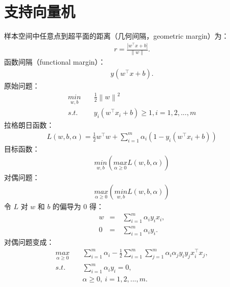 \documentclass[letterpaper,10pt,english]{sphinxmanual}
\begin{document}
\section{支持向量机}
\label{\detokenize{machineLearning/02_svm::doc}}\label{\detokenize{machineLearning/02_svm:id1}}
样本空间中任意点到超平面的距离（几何间隔，geometric margin）为：
\begin{equation*}
\begin{split}r = \frac{|w^{\top} x + b|}{\| w \|}.\end{split}
\end{equation*}
函数间隔（functional margin）：
\begin{equation*}
\begin{split}y(w^{\top} x + b).\end{split}
\end{equation*}
原始问题：
\begin{equation*}
\begin{split}\underset{w,b}{min} & &\  \frac{1}{2} \left \| w \right \|^2 \\
s.t. & &\  y_i(w^{\top} x_i + b) \geqslant 1, i=1,2,...,m\end{split}
\end{equation*}
拉格朗日函数：
\begin{equation*}
\begin{split}L(w,b,\alpha) = \frac{1}{2}w^{\top}w + \sum_{i=1}^m \alpha_i(1 - y_i(w^{\top} x_i + b))\end{split}
\end{equation*}
目标函数：
\begin{equation*}
\begin{split}\underset{w,b}{min}(\underset{\alpha \geqslant 0}{max}L(w,b,\alpha))\end{split}
\end{equation*}
对偶问题：
\begin{equation*}
\begin{split}\underset{\alpha \geqslant 0}{max}(\underset{w,b}{min}L(w,b,\alpha))\end{split}
\end{equation*}
令 \(L\) 对  \(w\) 和  \(b\) 的偏导为 0 得：
\begin{equation*}
\begin{split}w & = &\ \sum_{i=1}^m \alpha_i y_i x_i,\\
0 & = &\ \sum_{i=1}^m \alpha_i y_i.\end{split}
\end{equation*}
对偶问题变成：
\begin{equation*}
\begin{split}\underset{\alpha \geqslant 0}{max} &  &\  \sum_{i=1}^m\alpha_i - \frac{1}{2} \sum_{i=1}^m \sum_{j=1}^m \alpha_i \alpha_j y_i y_j x_i^{\top} x_j,\\
s.t.  &  &\  \sum_{i=1}^m \alpha_i y_i = 0,\\
      &  &\  \alpha \geqslant 0, \ i=1,2,...,m.\end{split}
\end{equation*}
\end{document}
